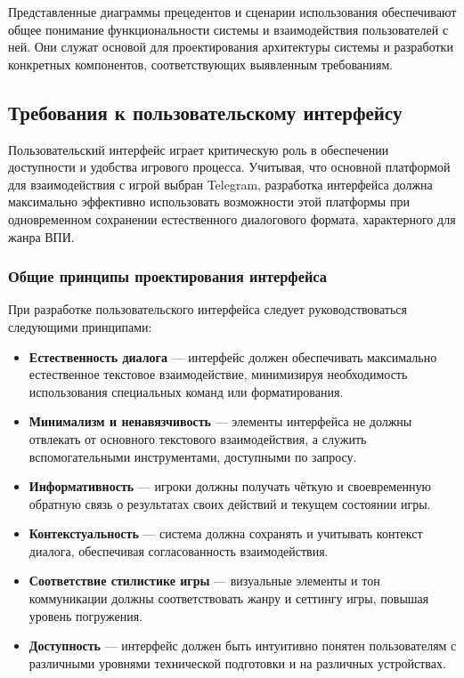 Представленные диаграммы прецедентов и сценарии использования обеспечивают общее понимание функциональности системы и взаимодействия пользователей с ней. Они служат основой для проектирования архитектуры системы и разработки конкретных компонентов, соответствующих выявленным требованиям.

\subsection{Требования к пользовательскому интерфейсу}

Пользовательский интерфейс играет критическую роль в обеспечении доступности и удобства игрового процесса. Учитывая, что основной платформой для взаимодействия с игрой выбран Telegram, разработка интерфейса должна максимально эффективно использовать возможности этой платформы при одновременном сохранении естественного диалогового формата, характерного для жанра ВПИ.

\subsubsection{Общие принципы проектирования интерфейса}

При разработке пользовательского интерфейса следует руководствоваться следующими принципами:

\begin{itemize}
    \item \textbf{Естественность диалога} — интерфейс должен обеспечивать максимально естественное текстовое взаимодействие, минимизируя необходимость использования специальных команд или форматирования.

    \item \textbf{Минимализм и ненавязчивость} — элементы интерфейса не должны отвлекать от основного текстового взаимодействия, а служить вспомогательными инструментами, доступными по запросу.

    \item \textbf{Информативность} — игроки должны получать чёткую и своевременную обратную связь о результатах своих действий и текущем состоянии игры.

    \item \textbf{Контекстуальность} — система должна сохранять и учитывать контекст диалога, обеспечивая согласованность взаимодействия.

    \item \textbf{Соответствие стилистике игры} — визуальные элементы и тон коммуникации должны соответствовать жанру и сеттингу игры, повышая уровень погружения.

    \item \textbf{Доступность} — интерфейс должен быть интуитивно понятен пользователям с различными уровнями технической подготовки и на различных устройствах.
\end{itemize}

